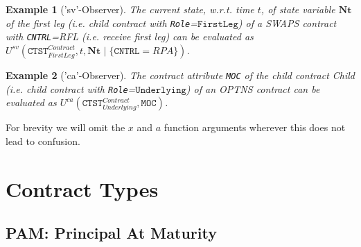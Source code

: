 \documentclass[9pt,oneside]{amsart}
\newtheorem{example}{Example}
\newcommand{\svar}[2]{\textbf{#1}_{#2}}
\newcommand{\attr}[1]{\texttt{#1}}
\newcommand{\cldsv}[4]{U^{sv}(#1,#2,\svar{#3}{} \mid\{#4\})}
\newcommand{\cldca}[2]{U^{ca}(#1,#2)}
\begin{document}
\begin{multicols}{2}
\begin{example}['sv'-Observer] The current state, w.r.t. time $t$, of state variable $\svar{Nt}{}$ of the \textit{first leg} (i.e. child contract with \verb'Role'=$\texttt{FirstLeg}$) of a SWAPS contract with \attr{CNTRL}=RFL (i.e. \textit{receive first leg}) can be evaluated as $\cldsv{\attr{CTST}_{FirstLeg}^{Contract}}{t}{Nt}{\attr{CNTRL}=RPA}$.
\end{example}

\begin{example}['ca'-Observer] The contract attribute \attr{MOC} of the child contract \textit{Child} (i.e. child contract with \verb'Role'=$\texttt{Underlying}$) of an OPTNS contract can be evaluated as $\cldca{\attr{CTST}_{Underlying}^{Contract}}{\attr{MOC}}$.
\end{example}

For brevity we will omit the $x$ and $a$ function arguments wherever this does not lead to confusion.




\end{multicols}

\newpage

\section{Contract Types}\label{sec:contracts}




\subsection{PAM: Principal At Maturity}\label{sec:pam}
\end{document}
